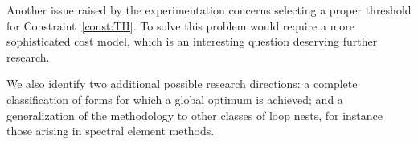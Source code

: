 Another issue raised by the experimentation concerns selecting a proper threshold for Constraint~\ref{const:TH}. To solve this problem would require a more sophisticated cost model, which is an interesting question deserving further research. 

We also identify two additional possible research directions: a complete classification of forms for which a global optimum is achieved; and a generalization of the methodology to other classes of loop nests, for instance those arising in spectral element methods.